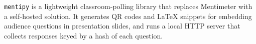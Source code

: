 \texttt{mentipy} is a lightweight classroom-polling library that
replaces Mentimeter with a self-hosted solution.  It generates QR codes
and \LaTeX{} snippets for embedding audience questions in presentation
slides, and runs a local HTTP server that collects responses keyed by a
hash of each question.
